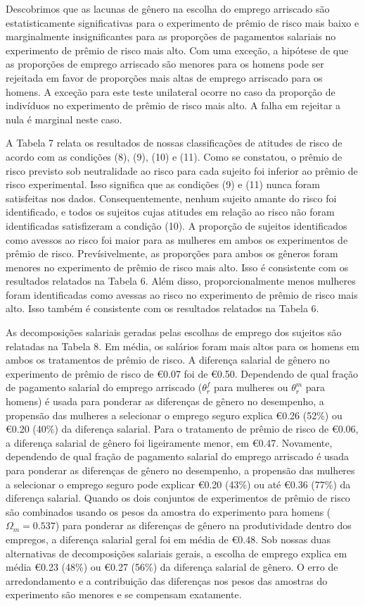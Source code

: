 \documentclass[a4paper,12pt]{article}[abntex2]
\begin{document}
Descobrimos que as lacunas de gênero na escolha do emprego arriscado são estatisticamente significativas para o experimento de prêmio de risco mais baixo e marginalmente insignificantes para as proporções de pagamentos salariais no experimento de prêmio de risco mais alto. Com uma exceção, a hipótese de que as proporções de emprego arriscado são menores para os homens pode ser rejeitada em favor de proporções mais altas de emprego arriscado para os homens. A exceção para este teste unilateral ocorre no caso da proporção de indivíduos no experimento de prêmio de risco mais alto. A falha em rejeitar a nula é marginal neste caso.

A Tabela 7 relata os resultados de nossas classificações de atitudes de risco de acordo com as condições (8), (9), (10) e (11). Como se constatou, o prêmio de risco previsto sob neutralidade ao risco para cada sujeito foi inferior ao prêmio de risco experimental. Isso significa que as condições (9) e (11) nunca foram satisfeitas nos dados. Consequentemente, nenhum sujeito amante do risco foi identificado, e todos os sujeitos cujas atitudes em relação ao risco não foram identificadas satisfizeram a condição (10). A proporção de sujeitos identificados como avessos ao risco foi maior para as mulheres em ambos os experimentos de prêmio de risco. Prevísivelmente, as proporções para ambos os gêneros foram menores no experimento de prêmio de risco mais alto. Isso é consistente com os resultados relatados na Tabela 6. Além disso, proporcionalmente menos mulheres foram identificadas como avessas ao risco no experimento de prêmio de risco mais alto. Isso também é consistente com os resultados relatados na Tabela 6.

As decomposições salariais geradas pelas escolhas de emprego dos sujeitos são relatadas na Tabela 8. Em média, os salários foram mais altos para os homens em ambos os tratamentos de prêmio de risco. A diferença salarial de gênero no experimento de prêmio de risco de €0.07 foi de €0.50. Dependendo de qual fração de pagamento salarial do emprego arriscado (\(\theta_r^f\) para mulheres ou \(\theta_r^m\) para homens) é usada para ponderar as diferenças de gênero no desempenho, a propensão das mulheres a selecionar o emprego seguro explica €0.26 (52\%) ou €0.20 (40\%) da diferença salarial. Para o tratamento de prêmio de risco de €0.06, a diferença salarial de gênero foi ligeiramente menor, em €0.47. Novamente, dependendo de qual fração de pagamento salarial do emprego arriscado é usada para ponderar as diferenças de gênero no desempenho, a propensão das mulheres a selecionar o emprego seguro pode explicar €0.20 (43\%) ou até €0.36 (77\%) da diferença salarial. Quando os dois conjuntos de experimentos de prêmio de risco são combinados usando os pesos da amostra do experimento para homens (\(\Omega_m = 0.537\)) para ponderar as diferenças de gênero na produtividade dentro dos empregos, a diferença salarial geral foi em média de €0.48. Sob nossas duas alternativas de decomposições salariais gerais, a escolha de emprego explica em média €0.23 (48\%) ou €0.27 (56\%) da diferença salarial de gênero. O erro de arredondamento e a contribuição das diferenças nos pesos das amostras do experimento são menores e se compensam exatamente.
\end{document}

